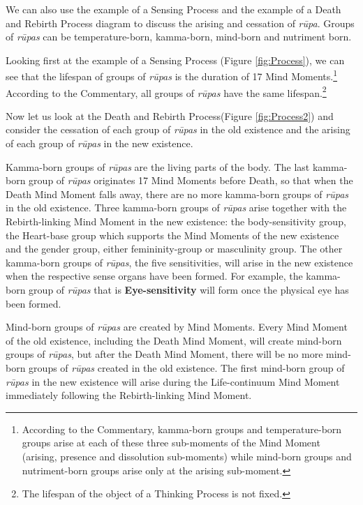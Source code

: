 We can also use the example of a Sensing Process and the example of a Death and Rebirth Process diagram to discuss the arising and cessation of \textit{rūpa}. Groups of \textit{rūpas} can be temperature-born, kamma-born, mind-born and nutriment born.

Looking first at the example of a Sensing Process (Figure \ref{fig:Process}), we can see that the lifespan of groups of \textit{rūpas} is the duration of 17 Mind Moments.\footnote{According to the Commentary, kamma-born groups and temperature-born groups arise at each of these three sub-moments of the Mind Moment (arising, presence and dissolution sub-moments) while mind-born groups and nutriment-born groups arise only at the arising sub-moment.} According to the Commentary, all groups of \textit{rūpas} have the same lifespan.\footnote{The lifespan of the object of a Thinking Process is not fixed.}

Now let us look at the Death and Rebirth Process(Figure \ref{fig:Process2}) and consider the cessation of each group of \textit{rūpas} in the old existence and the arising of each group of \textit{rūpas} in the new existence. 

Kamma-born groups of \textit{rūpas} are the living parts of the body. The last kamma-born group of \textit{rūpas} originates 17 Mind Moments before Death, so that when the Death Mind Moment falls away, there are no more kamma-born groups of \textit{rūpas} in the old existence. Three kamma-born groups of \textit{rūpas} arise together with the Rebirth-linking Mind Moment in the new existence: the body-sensitivity group, the Heart-base group which supports the Mind Moments of the new existence and the gender group, either femininity-group or masculinity group. The other kamma-born groups of \textit{rūpas}, the five sensitivities, will arise in the new existence when the respective sense organs have been formed. For example, the kamma-born group of \textit{rūpas} that is \textbf{Eye-sensitivity} will form once the physical eye has been formed.

Mind-born groups of \textit{rūpas} are created by Mind Moments. Every Mind Moment of the old existence, including the Death Mind Moment, will create mind-born groups of \textit{rūpas}, but after the Death Mind Moment, there will be no more mind-born groups of \textit{rūpas} created in the old existence. The first mind-born group of \textit{rūpas} in the new existence will arise during the Life-continuum Mind Moment immediately following the Rebirth-linking Mind Moment.

